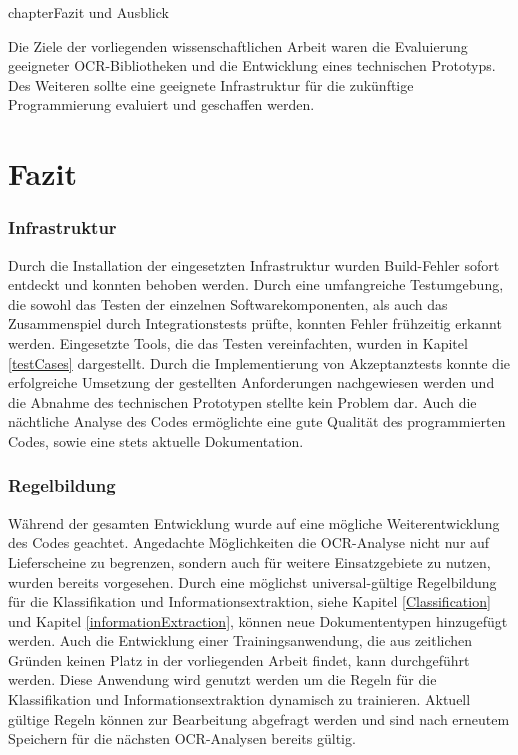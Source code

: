chapter{Fazit und Ausblick}


Die Ziele der vorliegenden wissenschaftlichen Arbeit waren die Evaluierung geeigneter \ac{OCR}-Bibliotheken und die Entwicklung eines technischen Prototyps. Des Weiteren sollte eine geeignete Infrastruktur für die zukünftige Programmierung evaluiert und geschaffen werden. \\

\section{Fazit}

\subsubsection{Infrastruktur}
Durch die Installation der eingesetzten Infrastruktur wurden Build-Fehler sofort entdeckt und konnten behoben werden. Durch eine umfangreiche Testumgebung, die sowohl das Testen der einzelnen Softwarekomponenten, als auch das Zusammenspiel durch Integrationstests prüfte, konnten Fehler frühzeitig erkannt werden. Eingesetzte Tools, die das Testen vereinfachten, wurden in Kapitel \ref{testCases} dargestellt. Durch die Implementierung von Akzeptanztests konnte die erfolgreiche Umsetzung der gestellten Anforderungen nachgewiesen werden und die Abnahme des technischen Prototypen stellte kein Problem dar. Auch die nächtliche Analyse des Codes ermöglichte eine gute Qualität des programmierten Codes, sowie eine stets aktuelle Dokumentation.

\subsubsection{Regelbildung}
Während der gesamten Entwicklung wurde auf eine mögliche Weiterentwicklung des Codes geachtet. Angedachte Möglichkeiten die \ac{OCR}-Analyse nicht nur auf Lieferscheine zu begrenzen, sondern auch für weitere Einsatzgebiete zu nutzen, wurden bereits vorgesehen. Durch eine möglichst universal-gültige Regelbildung für die Klassifikation und Informationsextraktion, siehe Kapitel \ref{Classification} und Kapitel \ref{informationExtraction}, können neue Dokumententypen hinzugefügt werden. Auch die Entwicklung einer Trainingsanwendung, die aus zeitlichen Gründen keinen Platz in der vorliegenden Arbeit findet, kann durchgeführt werden. Diese Anwendung wird genutzt werden um die Regeln für die Klassifikation und Informationsextraktion dynamisch zu trainieren. Aktuell gültige Regeln können zur Bearbeitung abgefragt werden und sind nach erneutem Speichern für die nächsten \ac{OCR}-Analysen bereits gültig.

